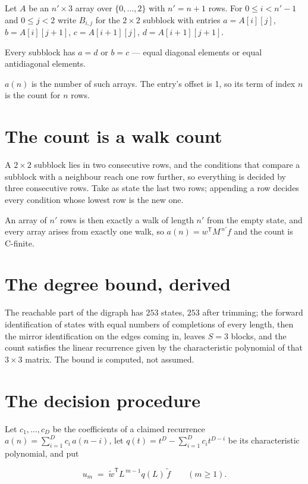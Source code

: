 \documentclass[11pt]{article}
\theoremstyle{definition}
\begin{document}
Let $A$ be an $n' \times 3$ array over $\{0,\dots,2\}$ with $n' = n + 1$ rows. For $0 \le i < n'-1$ and $0 \le j < 2$ write $B_{i,j}$ for the $2\times2$ subblock with entries $a = A[i][j]$, $b = A[i][j{+}1]$, $c = A[i{+}1][j]$, $d = A[i{+}1][j{+}1]$.

Every subblock has $a = d$ or $b = c$ --- equal diagonal elements or equal antidiagonal elements.

$a(n)$ is the number of such arrays. The entry's offset is 1, so its term of index $n$ is the count for $n$ rows.

\section{The count is a walk count}

A $2\times2$ subblock lies in two consecutive rows, and the conditions that compare a subblock with a neighbour reach one row further, so everything is decided by three consecutive rows. Take as state the last two rows; appending a row decides every condition whose lowest row is the new one.

An array of $n'$ rows is then exactly a walk of length $n'$ from the empty state, and every array arises from exactly one walk, so $a(n) = w^{\mathsf T}M^{\,n'}f$ and the count is C-finite.

\section{The degree bound, derived}

The reachable part of the digraph has $253$ states, $253$ after trimming; the forward identification of states with equal numbers of completions of every length, then the mirror identification on the edges coming in, leaves $S = 3$ blocks, and the count satisfies the linear recurrence given by the characteristic polynomial of that $3\times3$ matrix. The bound is computed, not assumed.

\section{The decision procedure}

Let $c_1,\dots,c_D$ be the coefficients of a claimed recurrence $a(n) = \sum_{i=1}^{D} c_i\,a(n-i)$, let $q(t) = t^{D} - \sum_{i=1}^{D} c_i t^{D-i}$ be its characteristic polynomial, and put

\[u_m \;=\; \tilde w^{\mathsf T} L^{\,m-1} q(L)\,\tilde f \qquad (m \ge 1).\]
\end{document}

